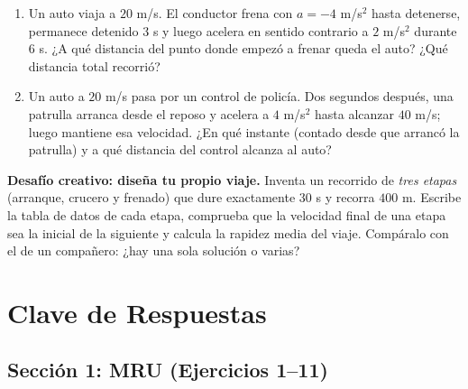 \documentclass[12pt, letterpaper]{article}
\begin{document}
\begin{enumerate}[leftmargin=*, resume]
  \item \dificil{} Un auto viaja a $20$ m/s. El conductor frena con $a = -4$ m/s$^2$ hasta detenerse, permanece detenido $3$ s y luego acelera en sentido contrario a $2$ m/s$^2$ durante $6$ s. ¿A qué distancia del punto donde empezó a frenar queda el auto? ¿Qué distancia total recorrió?

  \item \dificil{} Un auto a $20$ m/s pasa por un control de policía. Dos segundos después, una patrulla arranca desde el reposo y acelera a $4$ m/s$^2$ hasta alcanzar $40$ m/s; luego mantiene esa velocidad. ¿En qué instante (contado desde que arrancó la patrulla) y a qué distancia del control alcanza al auto?
\end{enumerate}

\begin{cuadroextra}
  \textbf{Desafío creativo: diseña tu propio viaje.} Inventa un recorrido de \emph{tres etapas} (arranque, crucero y frenado) que dure exactamente $30$ s y recorra $400$ m. Escribe la tabla de datos de cada etapa, comprueba que la velocidad final de una etapa sea la inicial de la siguiente y calcula la rapidez media del viaje. Compáralo con el de un compañero: ¿hay una sola solución o varias?
\end{cuadroextra}

\newpage

\ifmwclaves
  \section{Clave de Respuestas}

  \subsection*{Sección 1: MRU (Ejercicios 1--11)}
\end{document}
